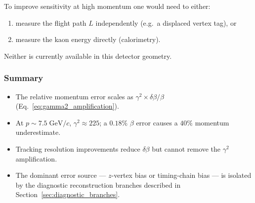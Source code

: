 To improve sensitivity at high momentum one would need to either:
\begin{enumerate}
  \item measure the flight path $L$ independently (e.g.\ a displaced vertex tag), or
  \item measure the kaon energy directly (calorimetry).
\end{enumerate}
Neither is currently available in this detector geometry.

\subsubsection{Summary}

\begin{itemize}
  \item The relative momentum error scales as $\gamma^2 \times \delta\beta/\beta$
        (Eq.~\eqref{eq:gamma2_amplification}).
  \item At $p \sim 7.5\;\text{GeV}/c$, $\gamma^2 \approx 225$; a $0.18\%$ $\beta$
        error causes a $40\%$ momentum underestimate.
  \item Tracking resolution improvements reduce $\delta\beta$ but cannot remove
        the $\gamma^2$ amplification.
  \item The dominant error source — $z$-vertex bias or timing-chain bias — is
        isolated by the diagnostic reconstruction branches described in
        Section~\ref{sec:diagnostic_branches}.
\end{itemize}
